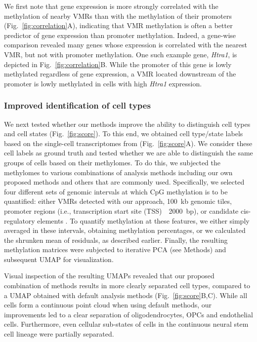 \documentclass[10pt]{article}
\begin{document}
We first note that gene expression is more strongly correlated with the methylation of nearby VMRs than with the methylation of their promoters (Fig.~\ref{fig:correlation}A), indicating that VMR methylation is often a better predictor of gene expression than promoter methylation.
Indeed, a gene-wise comparison revealed many genes whose expression is correlated with the nearest VMR, but not with promoter methylation.
One such example gene, \textit{Htra1}, is depicted in Fig.~\ref{fig:correlation}B.
While the promoter of this gene is lowly methylated regardless of gene expression, a VMR located downstream of the promoter is lowly methylated in cells with high \textit{Htra1} expression.

\subsubsection*{Improved identification of cell types}

We next tested whether our methods improve the ability to distinguish cell types and cell states (Fig.~\ref{fig:score}).
To this end, we obtained cell type/state labels based on the single-cell transcriptomes from \citet{kremer_scnmt} (Fig.~\ref{fig:score}A).
We consider these cell labels as ground truth and tested whether we are able to distinguish the same groups of cells based on their methylomes.
To do this, we subjected the methylomes to various combinations of analysis methods including our own proposed methods and others that are commonly used.
Specifically, we selected four different sets of genomic intervals at which CpG methylation is to be quantified:
either VMRs detected with our approach, 100~kb genomic tiles, promoter regions (i.e., transcription start site (TSS)~\textpm~2000~bp), or candidate cis-regulatory elements \citep[ENCODE cCREs,][]{encode2020expanded}.
To quantify methylation at these features, we either simply averaged in these intervals, obtaining methylation percentages, or we calculated the shrunken mean of residuals, as described earlier.
Finally, the resulting methylation matrices were subjected to iterative PCA (see Methods) and subsequent UMAP for visualization.


Visual inspection of the resulting UMAPs revealed that our proposed combination of methods results in more clearly separated cell types, compared to a UMAP obtained with default analysis methods (Fig.~\ref{fig:score}B,C).
While all cells form a continuous point cloud when using default methods, our improvements led to a clear separation of oligodendrocytes, OPCs and endothelial cells.
Furthermore, even cellular sub-states of cells in the continuous neural stem cell lineage were partially separated.
\end{document}
